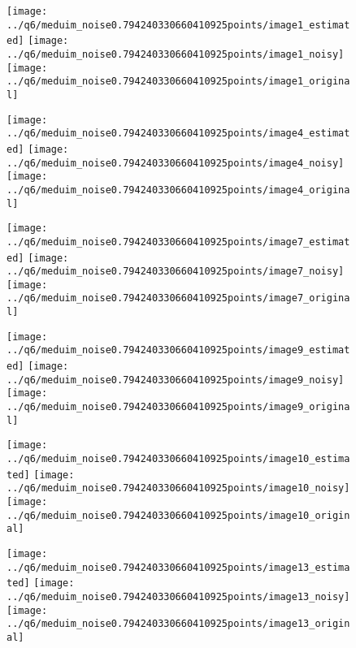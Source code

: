 \documentclass[a4paper,12pt]{article}
\begin{document}
\begin{figure}[!htb]
  \texttt{[image: ../q6/meduim\_noise0.794240330660410925points/image1\_estimated]}
\endminipage\hfill
{}
  \texttt{[image: ../q6/meduim\_noise0.794240330660410925points/image1\_noisy]}
\endminipage\hfill
{}
  \texttt{[image: ../q6/meduim\_noise0.794240330660410925points/image1\_original]}
\endminipage\hfill

  \texttt{[image: ../q6/meduim\_noise0.794240330660410925points/image4\_estimated]}
\endminipage\hfill
{}
  \texttt{[image: ../q6/meduim\_noise0.794240330660410925points/image4\_noisy]}
\endminipage\hfill
{}
  \texttt{[image: ../q6/meduim\_noise0.794240330660410925points/image4\_original]}
\endminipage\hfill

  \texttt{[image: ../q6/meduim\_noise0.794240330660410925points/image7\_estimated]}
\endminipage\hfill
{}
  \texttt{[image: ../q6/meduim\_noise0.794240330660410925points/image7\_noisy]}
\endminipage\hfill
{}
  \texttt{[image: ../q6/meduim\_noise0.794240330660410925points/image7\_original]}
\endminipage\hfill

  \texttt{[image: ../q6/meduim\_noise0.794240330660410925points/image9\_estimated]}
\endminipage\hfill
{}
  \texttt{[image: ../q6/meduim\_noise0.794240330660410925points/image9\_noisy]}
\endminipage\hfill
{}
  \texttt{[image: ../q6/meduim\_noise0.794240330660410925points/image9\_original]}
\endminipage\hfill

  \texttt{[image: ../q6/meduim\_noise0.794240330660410925points/image10\_estimated]}
\endminipage\hfill
{}
  \texttt{[image: ../q6/meduim\_noise0.794240330660410925points/image10\_noisy]}
\endminipage\hfill
{}
  \texttt{[image: ../q6/meduim\_noise0.794240330660410925points/image10\_original]}
\endminipage\hfill

  \texttt{[image: ../q6/meduim\_noise0.794240330660410925points/image13\_estimated]}
\endminipage\hfill
{}
  \texttt{[image: ../q6/meduim\_noise0.794240330660410925points/image13\_noisy]}
\endminipage\hfill
{}
  \texttt{[image: ../q6/meduim\_noise0.794240330660410925points/image13\_original]}
\endminipage\hfill


\end{figure}
\end{document}
